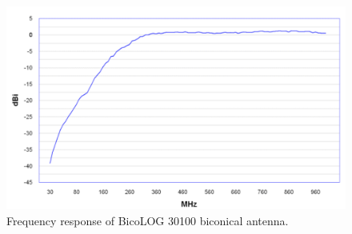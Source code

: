 \documentclass[preprint2]{aastex}
\begin{document}
\begin{center}
\begin{figure}[h]
\centering
\includegraphics[scale=0.5]{images/bicolog_frequency_response.png}
\caption{Frequency response of BicoLOG 30100 biconical antenna.}
\label{BicoLOG response}
\end{figure}


\end{center}
\end{document}
